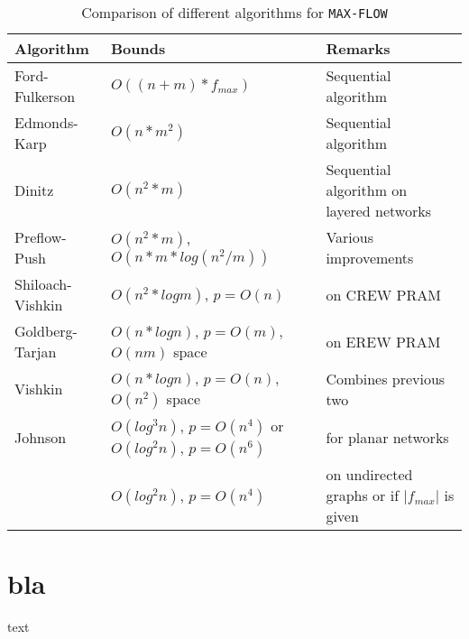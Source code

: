 \documentclass[a4paper,10pt, twocolumn]{article}
\begin{document}
\begin{table*}
\begin{tabular}{|l|l|l|}
\hline
Algorithm & Bounds & Remarks \\
\hline
Ford-Fulkerson\cite{ahuja93} & $O((n+m) * f_{max})$ & Sequential algorithm \\
Edmonds-Karp\cite{ahuja93} & $O(n*m^2)$ & Sequential algorithm  \\
Dinitz\cite{dinitz70}& $O(n^2*m)$ & Sequential algorithm on layered networks\\
Preflow-Push\cite{ahuja93} & $O(n^2*m)$, $O(n*m*log(n^2/m))$ & Various improvements\\
Shiloach-Vishkin\cite{yossi81} & $O(n^2*log m)$, $p=O(n)$ & on CREW PRAM\\
Goldberg-Tarjan\cite{goldberg89} & $O(n*log n)$, $p=O(m)$, $O(nm)$ space & on EREW PRAM \\
Vishkin\cite{vishkin92} & $O(n*log n)$, $p=O(n)$, $O(n^2)$ space & Combines previous two\\
Johnson\cite{johnson87} & $O(log^{3} n)$, $p=O(n^{4})$ or $O(log^{2} n)$, $p=O(n^{6})$ &
for planar networks\\
 & $	O(log^{2} n)$, $p=O(n^{4})$ & on undirected graphs or if  $\lvert f_{max} \rvert$ is given\\
\hline
\end{tabular}
\caption{Comparison of different algorithms for \lstinline|MAX-FLOW|}
\label{tbl:results}
\end{table*}


\section{bla}
text \cite{ahuja93} \cite{papa95} \cite{yossi81} \cite{vishkin92} \cite{goldberg89} \cite{goldberg91} \cite{goldberg98} \cite{johnson87} \cite{schieber89} \cite{cherivan89} 

\printbibliography
\end{document}
